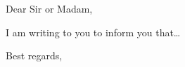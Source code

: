 \documentclass[11pt, a4paper]{letter}
\begin{document}
\begin{letter}{}
\opening{Dear Sir or Madam,}
{
    I am writing to you to inform you that\dots
}
\closing{Best regards,}
\end{letter}
\end{document}
